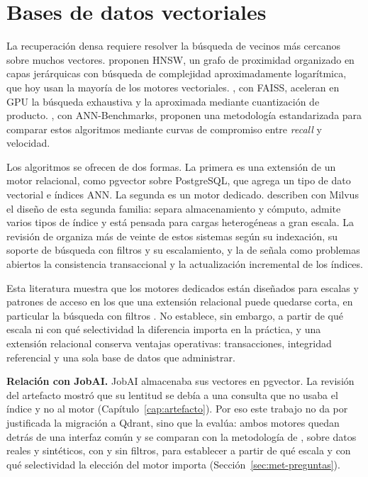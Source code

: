 \section{Bases de datos vectoriales}
\label{sec:estado-arte-vectordb}

La recuperación densa requiere resolver la búsqueda de vecinos más cercanos sobre muchos vectores. \citet{Malkov2020} proponen HNSW, un grafo de proximidad organizado en capas jerárquicas con búsqueda de complejidad aproximadamente logarítmica, que hoy usan la mayoría de los motores vectoriales. \citet{Johnson2019}, con FAISS, aceleran en GPU la búsqueda exhaustiva y la aproximada mediante cuantización de producto. \citet{Aumuller2020}, con ANN-Benchmarks, proponen una metodología estandarizada para comparar estos algoritmos mediante curvas de compromiso entre \textit{recall} y velocidad.

Los algoritmos se ofrecen de dos formas. La primera es una extensión de un motor relacional, como pgvector sobre PostgreSQL, que agrega un tipo de dato vectorial e índices ANN. La segunda es un motor dedicado. \citet{Wang2021} describen con Milvus el diseño de esta segunda familia: separa almacenamiento y cómputo, admite varios tipos de índice y está pensada para cargas heterogéneas a gran escala. La revisión de \citet{Pan2024} organiza más de veinte de estos sistemas según su indexación, su soporte de búsqueda con filtros y su escalamiento, y la de \citet{Taipalus2024} señala como problemas abiertos la consistencia transaccional y la actualización incremental de los índices.

Esta literatura muestra que los motores dedicados están diseñados para escalas y patrones de acceso en los que una extensión relacional puede quedarse corta, en particular la búsqueda con filtros \citep{Sanca2024}. No establece, sin embargo, a partir de qué escala ni con qué selectividad la diferencia importa en la práctica, y una extensión relacional conserva ventajas operativas: transacciones, integridad referencial y una sola base de datos que administrar.

\textbf{Relación con JobAI.} JobAI almacenaba sus vectores en pgvector. La revisión del artefacto mostró que su lentitud se debía a una consulta que no usaba el índice y no al motor (Capítulo~\ref{cap:artefacto}). Por eso este trabajo no da por justificada la migración a Qdrant, sino que la evalúa: ambos motores quedan detrás de una interfaz común y se comparan con la metodología de \citet{Aumuller2020}, sobre datos reales y sintéticos, con y sin filtros, para establecer a partir de qué escala y con qué selectividad la elección del motor importa (Sección~\ref{sec:met-preguntas}).

